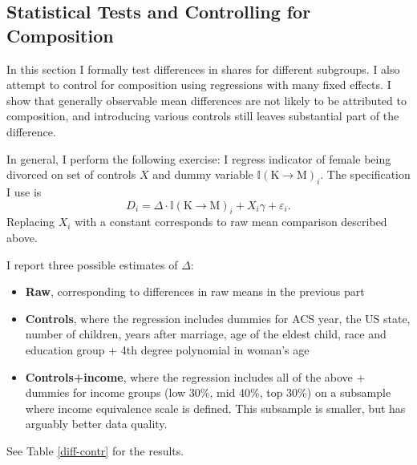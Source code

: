 \documentclass[12pt,letter]{article}
\newcommand{\I}{\mathbb{I}}
\begin{document}
\subsection{Statistical Tests and Controlling for Composition}

In this section I formally test differences in shares for different subgroups. I also attempt to control for composition using regressions with many fixed effects. I show that generally observable mean differences are not likely to be attributed to composition, and introducing various controls still leaves substantial part of the difference. 

In general, I perform the following exercise: I regress indicator of female being divorced on set of controls $X$ and dummy variable $\I(\text{K$\to$M})_i$. The specification I use is
\[D_i = \Delta \cdot \I(\text{K$\to$M})_i + X_i\gamma + \varepsilon_i.\]
Replacing $X_i$ with a constant corresponds to raw mean comparison described above. 

I report three possible estimates of $\Delta$:
\begin{itemize}
\item \textbf{Raw}, corresponding to differences in raw means in the previous part
\item \textbf{Controls}, where the regression includes dummies for ACS year, the US state, number of children, years after marriage, age of the eldest child, race and education group + 4th degree polynomial in woman's age
\item \textbf{Controls+income}, where the regression includes all of the above + dummies for income groups (low 30\%, mid 40\%, top 30\%) on a subsample where income equivalence scale is defined. This subsample is smaller, but has arguably better data quality.
\end{itemize}

See Table \ref{diff-contr} for the results. 
\end{document}
